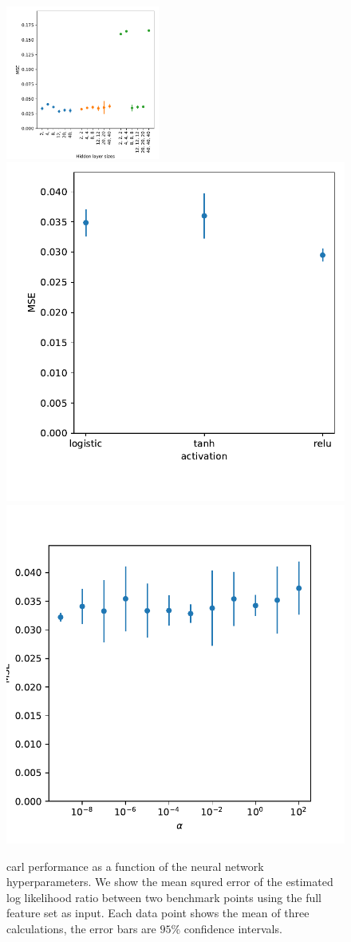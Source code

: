 \begin{figure}
  \includegraphics[width=0.45\textwidth]{figures/appendix/pointwise_tuning_full/mse_full_mlp_hidden_layer_sizes.pdf}%
  \includegraphics[height=0.45\textwidth]{figures/appendix/pointwise_tuning_full/mse_full_mlp_activation.pdf}\\%
  \includegraphics[height=0.45\textwidth]{figures/appendix/pointwise_tuning_full/mse_full_mlp_alpha.pdf}%
  \caption{carl performance as a function of the neural network
    hyperparameters. We show the mean squred error of the estimated
    log likelihood ratio between two benchmark points using the full
    feature set as input. Each data point shows the mean of three
    calculations, the error bars are $95\%$ confidence intervals.}
  \label{fig:pointwise_tuning_full_mlp_tuning}
\end{figure}

